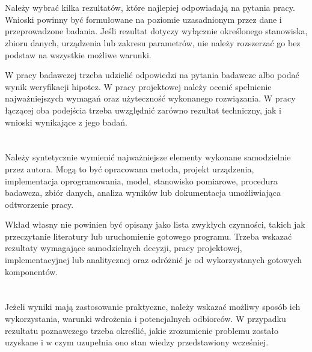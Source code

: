 \section{}

Należy wybrać kilka rezultatów, które najlepiej odpowiadają na pytania pracy. Wnioski powinny być formułowane na poziomie uzasadnionym przez dane i przeprowadzone badania. Jeśli rezultat dotyczy wyłącznie określonego stanowiska, zbioru danych, urządzenia lub zakresu parametrów, nie należy rozszerzać go bez podstaw na wszystkie możliwe warunki.

W pracy badawczej trzeba udzielić odpowiedzi na pytania badawcze albo podać wynik weryfikacji hipotez. W pracy projektowej należy ocenić spełnienie najważniejszych wymagań oraz użyteczność wykonanego rozwiązania. W pracy łączącej oba podejścia trzeba uwzględnić zarówno rezultat techniczny, jak i wnioski wynikające z jego badań.

\section{}

Należy syntetycznie wymienić najważniejsze elementy wykonane samodzielnie przez autora. Mogą to być opracowana metoda, projekt urządzenia, implementacja oprogramowania, model, stanowisko pomiarowe, procedura badawcza, zbiór danych, analiza wyników lub dokumentacja umożliwiająca odtworzenie pracy.

Wkład własny nie powinien być opisany jako lista zwykłych czynności, takich jak przeczytanie literatury lub uruchomienie gotowego programu. Trzeba wskazać rezultaty wymagające samodzielnych decyzji, pracy projektowej, implementacyjnej lub analitycznej oraz odróżnić je od wykorzystanych gotowych komponentów.

\section{}

Jeżeli wyniki mają zastosowanie praktyczne, należy wskazać możliwy sposób ich wykorzystania, warunki wdrożenia i potencjalnych odbiorców. W przypadku rezultatu poznawczego trzeba określić, jakie zrozumienie problemu zostało uzyskane i w czym uzupełnia ono stan wiedzy przedstawiony wcześniej.

